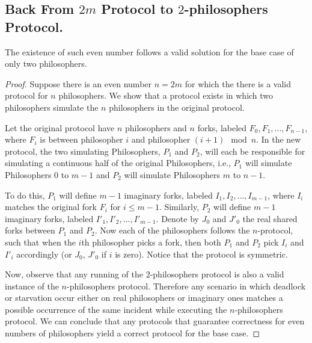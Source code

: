 \documentclass[manuscript,screen,review]{acmart}
\begin{document}
\subsection{ Back From $2m$ Protocol to $2$-philosophers Protocol.}

  \begin{lemma} 
  The existence of such even number follows a valid solution for the base case of only two philosophers.
\end{lemma}
\begin{proof}
Suppose there is an even number $n = 2m$ for which the there is a valid protocol for $n$ philosophers. We show that a protocol exists in which two philosophers simulate the $n$ philosophers in the original protocol.

Let the original protocol have $n$ philosophers and $n$ forks, labeled $F_0, F_1, ..., F_{n-1}$, where $F_i$ is between philosopher $i$ and philosopher $(i+1) \mod n$. In the new protocol, the two simulating Philosophers, $P_1$ and $P_2$, will each be responsible for simulating a continuous half of the original Philosophers, i.e., $P_1$ will simulate Philosophers $0$ to $m-1$ and $P_2$ will simulate Philosophers $m$ to $n-1$. 

To do this, $P_1$ will define $m-1$ imaginary forks, labeled $I_1, I_2, \dots, I_{m-1}$, where $I_i$ matches the original fork $F_{i}$ for $i \le m-1$. Similarly, $P_2$ will define $m-1$ imaginary forks, labeled $I'_1, I'_2, \dots, I'_{m-1}$. Denote by $J_{0}$ and $J'_{0}$ the real shared forks between $P_1$ and $P_2$. Now each of the philosophers follows the $n$-protocol, such that when the $i$th philosopher picks a fork, then both $P_1$ and $P_2$ pick $I_i$ and $I'_i$ accordingly (or $J_0$, $J'_0$ if $i$ is zero). Notice that the protocol is symmetric.

Now, observe that any running of the $2$-philosophers protocol is also a valid instance of the $n$-philosophers protocol. Therefore any scenario in which deadlock or starvation occur either on real philosophers or imaginary ones matches a possible occurrence of the same incident while executing the $n$-philosophers protocol. We can conclude that any protocols that guarantee correctness for even numbers of philosophers yield a correct protocol for the base case.
\end{proof}



\end{document}
